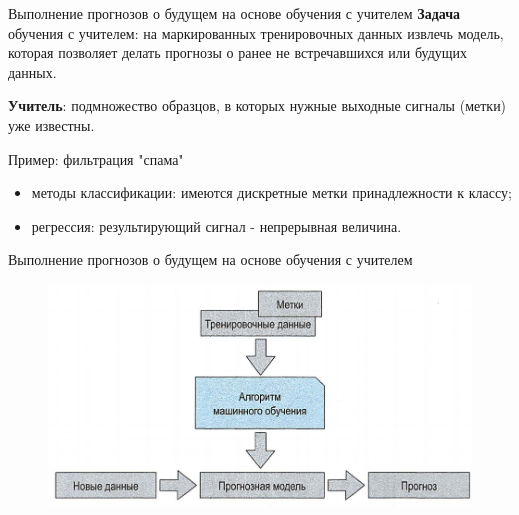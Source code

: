 \documentclass{beamer}
\begin{document}
\begin{frame}[t]{Выполнение прогнозов о будущем на основе обучения с учителем}
\textbf{Задача} обучения с учителем: на маркированных тренировочных данных извлечь модель, которая позволяет делать прогнозы о ранее не встречавшихся или будущих данных.

\textbf{Учитель}: подмножество образцов, в которых нужные выходные сигналы (метки) уже известны.

Пример: фильтрация "спама"
\begin{itemize}
\item методы классификации: имеются дискретные метки принадлежности к классу;
\item регрессия: результирующий сигнал - непрерывная величина.
\end{itemize}
\end{frame}

\begin{frame}[t]{Выполнение прогнозов о будущем на основе обучения с учителем}
\begin{figure}[h]
\centering
\includegraphics[scale=0.5]{images/lec01-pic04.png}
\end{figure}
\end{frame}
\end{document}
